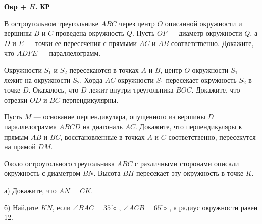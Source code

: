 \centerline{\bf \Huge Окр + $H$. КР}
\centerline{\bf \Huge }


 В остроугольном треугольнике $ABC$ через центр $O$ описанной окружности и вершины $B$ и $C$
проведена окружность $Q$. Пусть $OF$ — диаметр окружности $Q$, а $D$ и $E$ — точки ее пересечения
с прямыми $AC$ и $AB$ соответственно. Докажите, что $ADFE$ — параллелограмм.

 Окружности $S_1$ и $S_2$ пересекаются в точках $A$ и $B$, центр $O$ окружности $S_1$ лежит на окружности $S_2$. Хорда $AC$ окружности $S_1$ пересекает окружность $S_2$ в точке $D$. Оказалось, что $D$
лежит внутри треугольника $BOC$. Докажите, что отрезки $OD$ и $BC$ перпендикулярны.

 Пусть $M$ — основание перпендикуляра, опущенного из вершины $D$ параллелограмма $ABCD$
на диагональ $AC$. Докажите, что перпендикуляры к прямым $AB$ и $BC$, восстановленные в
точках $A$ и $C$ соответственно, пересекутся на прямой $DM$.

 Около остроугольного треугольника $ABC$ с различными сторонами описали окружность с
диаметром $BN$. Высота $BH$ пересекает эту окружность в точке $K$.

а) Докажите, что $AN$ = $CK$.

б) Найдите $KN$, если $\angle BAC = 35^{\circ}◦$
, $\angle ACB = 65^{\circ}◦$
, а радиус окружности равен 12.